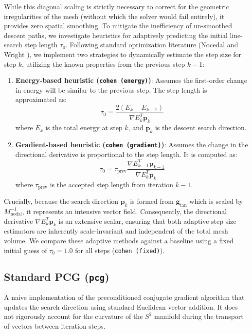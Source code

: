 \documentclass[11pt,a4paper]{article}
\begin{document}
While this diagonal scaling is strictly necessary to correct for the geometric irregularities of the mesh (without which the solver would fail entirely), it provides zero spatial smoothing. To mitigate the inefficiency of un-smoothed descent paths, we investigate heuristics for adaptively predicting the initial line-search step length $\tau_0$. Following standard optimization literature (Nocedal and Wright \cite{nocedal1999numerical}), we implement two strategies to dynamically estimate the step size for step $k$, utilizing the known properties from the previous step $k-1$:
\begin{enumerate}
    \item \textbf{Energy-based heuristic (\texttt{cohen (energy)})}: Assumes the first-order change in energy will be similar to the previous step. The step length is approximated as:
    \begin{equation}
        \tau_0 = \frac{2(E_k - E_{k-1})}{\nabla E_k^T \mathbf{p}_k}
    \end{equation}
    where $E_k$ is the total energy at step $k$, and $\mathbf{p}_k$ is the descent search direction.
    \item \textbf{Gradient-based heuristic (\texttt{cohen (gradient)})}: Assumes the change in the directional derivative is proportional to the step length. It is computed as:
    \begin{equation}
        \tau_0 = \tau_{\text{prev}} \frac{\nabla E_{k-1}^T \mathbf{p}_{k-1}}{\nabla E_k^T \mathbf{p}_k}
    \end{equation}
    where $\tau_{\text{prev}}$ is the accepted step length from iteration $k-1$.
\end{enumerate}
Crucially, because the search direction $\mathbf{p}_k$ is formed from $\mathbf{g}_{\text{tan}}$ which is scaled by $M_{\text{nodal}}^{-1}$, it represents an intensive vector field. Consequently, the directional derivative $\nabla E_k^T \mathbf{p}_k$ is an extensive scalar, ensuring that both adaptive step size estimators are inherently scale-invariant and independent of the total mesh volume. We compare these adaptive methods against a baseline using a fixed initial guess of $\tau_0=1.0$ for all steps (\texttt{cohen (fixed)}).

\subsection{Standard PCG (\texttt{pcg})}
A naive implementation of the preconditioned conjugate gradient algorithm that updates the search direction using standard Euclidean vector addition. It does not rigorously account for the curvature of the $S^2$ manifold during the transport of vectors between iteration steps.
\end{document}
